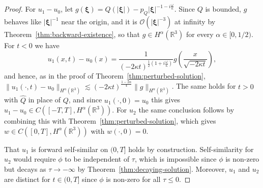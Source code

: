 \documentclass[10pt,a4paper]{amsart}
\begin{document}
\begin{proof}
  For \(u_{1} - u_{0}\), let
  \(g(\bm{\xi}) = Q(|\bm{\xi}|) - p_{Q}|\bm{\xi}|^{-1 -
    i\frac{\omega}{\kappa}}\). Since \(Q\) is bounded, \(g\) behaves
  like \(|\bm{\xi}|^{-1}\) near the origin, and it is
  \(\mathcal{O}(|\bm{\xi}|^{-3})\) at infinity by
  Theorem~\ref{thm:backward-existence}, so that
  \(g \in H^{\alpha}(\mathbb{R}^{3})\) for every
  \(\alpha \in [0, 1/2)\). For \(t < 0\) we have
  \begin{equation*}
    u_{1}(x, t) - u_{0}(x)
    = \frac{1}{(-2\kappa t)^{\frac{1}{2}\left(1 + i\frac{\omega}{\kappa}\right)}}
    g\left(\frac{x}{\sqrt{-2\kappa t}}\right),
  \end{equation*}
  and hence, as in the proof of Theorem~\ref{thm:perturbed-solution},
  \(\|u_{1}(\cdot, t) - u_{0}\|_{H^{\alpha}(\mathbb{R}^{3})} \lesssim
  (-2\kappa t)^{\frac{1 -
      2\alpha}{4}}\|g\|_{H^{\alpha}(\mathbb{R}^{3})}\). The same holds
  for \(t > 0\) with \(\hat{Q}\) in place of \(Q\), and since
  \(u_{1}(\cdot, 0) = u_{0}\) this gives
  \(u_{1} - u_{0} \in C([-T, T], H^{\alpha}(\mathbb{R}^{3}))\). For
  \(u_{2}\) the same conclusion follows by combining this with
  Theorem~\ref{thm:perturbed-solution}, which gives
  \(w \in C([0, T], H^{\alpha}(\mathbb{R}^{3}))\) with
  \(w(\cdot, 0) = 0\).

  That \(u_{1}\) is forward self-similar on \((0, T]\) holds by
  construction. Self-similarity for \(u_{2}\) would require \(\phi\)
  to be independent of \(\tau\), which is impossible since \(\phi\) is
  non-zero but decays as \(\tau \to -\infty\) by
  Theorem~\ref{thm:decaying-solution}. Moreover, \(u_{1}\) and
  \(u_{2}\) are distinct for \(t \in (0, T]\) since \(\phi\) is
  non-zero for all \(\tau \leq 0\).
\end{proof}
\end{document}
